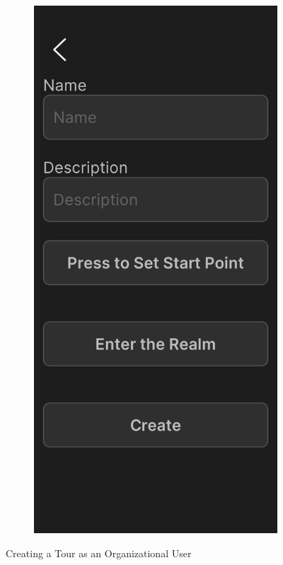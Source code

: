 \documentclass[12pt, titlepage]{article}
\begin{document}
\begin{figure}[ht!]
\begin{subfigure}[b]{0.48\textwidth}
    \end{subfigure}
    \hfill
    \begin{subfigure}[b]{0.48\textwidth}
        \centering
        \includegraphics[width=\textwidth]{create_tour.png}
    \end{subfigure}
    \caption{Creating a Tour as an Organizational User}
    \label{fig:createtour}
\end{figure}
\end{document}
